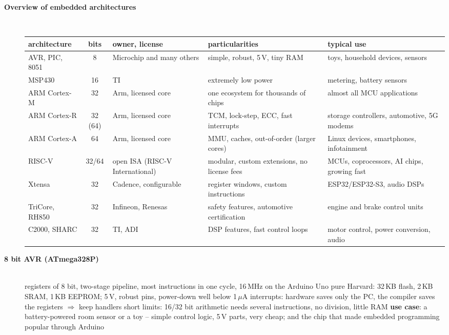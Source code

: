 \begin{description}
\item[{\rot\bf Overview of embedded architectures}]~\\[-\lblskip]
\begin{center}
{\footnotesize
\begin{tabularx}{\linewidth}{|l|c|L|L|L|}
\hline
\textbf{architecture} & \textbf{bits} & \textbf{owner, license} & \textbf{particularities} & \textbf{typical use} \\
\hline
AVR, PIC, 8051 & 8 & Microchip and many others & simple, robust, 5\,V, tiny RAM & toys, household devices, sensors \\
MSP430 & 16 & TI & extremely low power & metering, battery sensors \\
ARM Cortex-M & 32 & Arm, licensed core & one ecosystem for thousands of chips & almost all MCU applications \\
ARM Cortex-R & 32 (64) & Arm, licensed core & TCM, lock-step, ECC, fast interrupts & storage controllers, automotive, 5G modems \\
ARM Cortex-A & 64 & Arm, licensed core & MMU, caches, out-of-order (larger cores) & Linux devices, smartphones, infotainment \\
RISC-V & 32/64 & open ISA (RISC-V International) & modular, custom extensions, no license fees & MCUs, coprocessors, AI chips, growing fast \\
Xtensa & 32 & Cadence, configurable & register windows, custom instructions & ESP32/ESP32-S3, audio DSPs \\
TriCore, RH850 & 32 & Infineon, Renesas & safety features, automotive certification & engine and brake control units \\
C2000, SHARC & 32 & TI, ADI & DSP features, fast control loops & motor control, power conversion, audio \\
\hline
\end{tabularx}}
\end{center}
\os{\newpage}

\item[{\rot\bf 8 bit AVR (ATmega328P)}]~\\[-\lblskip]
\bi
	 registers of 8 bit, two-stage pipeline, most instructions in one cycle, 16\,MHz on the Arduino Uno
	\ite pure Harvard: 32\,KB flash, 2\,KB SRAM, 1\,KB EEPROM; 5\,V, robust pins, power-down well below 1\,$\mu$A
	\ite interrupts: hardware saves only the PC, the compiler saves the registers $\Rightarrow$ keep handlers short
	\ite limits: 16/32 bit arithmetic needs several instructions, no division, little RAM
	\ite \textbf{use case}: a battery-powered room sensor or a toy -- simple control logic, 5\,V parts, very cheap; and the chip that made embedded programming popular through Arduino
\ei
\os{\newpage}


\end{description}
